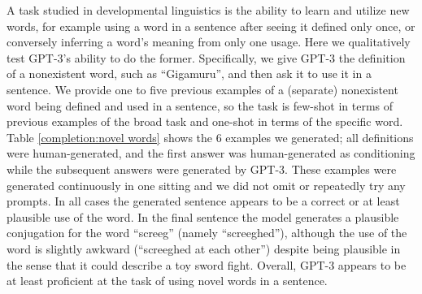 A task studied in developmental linguistics \cite{carey1978acquiring} is the ability to learn and utilize new words, for example using a word in a sentence after seeing it defined only once, or conversely inferring a word’s meaning from only one usage.  Here we qualitatively test GPT-3’s ability to do the former.  Specifically, we give GPT-3 the definition of a nonexistent word, such as ``Gigamuru'', and then ask it to use it in a sentence.  We provide one to five previous examples of a (separate) nonexistent word being defined and used in a sentence, so the task is few-shot in terms of previous examples of the broad task and one-shot in terms of the specific word.  Table \ref{completion:novel words} shows the 6 examples we generated; all definitions were human-generated, and the first answer was human-generated as conditioning while the subsequent answers were generated by GPT-3.  These examples were generated continuously in one sitting and we did not omit or repeatedly try any prompts.  In all cases the generated sentence appears to be a correct or at least plausible use of the word.  In the final sentence the model generates a plausible conjugation for the word ``screeg'' (namely ``screeghed''), although the use of the word is slightly awkward (``screeghed at each other'') despite being plausible in the sense that it could describe a toy sword fight.  Overall, GPT-3 appears to be at least proficient at the task of using novel words in a sentence.

